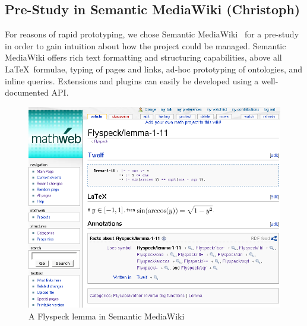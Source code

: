 \documentclass{llncs}
\begin{document}
\subsection{Pre-Study in Semantic MediaWiki (Christoph)}
\label{sec:smw-study}

For reasons of rapid prototyping, we chose Semantic
MediaWiki~\cite{KrSchVr:semwiki-reasoning07} for a pre-study in order to gain intuition
about how the project could be managed.  Semantic
MediaWiki offers rich text formatting and structuring capabilities, above all \LaTeX\
formulae, typing of pages and links, ad-hoc prototyping of ontologies, and inline queries.
Extensions and plugins can easily be developed using a well-documented API.

\begin{figure}
  \centering
  \includegraphics[width=\textwidth]{smw-lemma}
  \caption{A Flyspeck lemma in Semantic MediaWiki}
  \label{fig:smw-lemma}
\end{figure}
\end{document}
